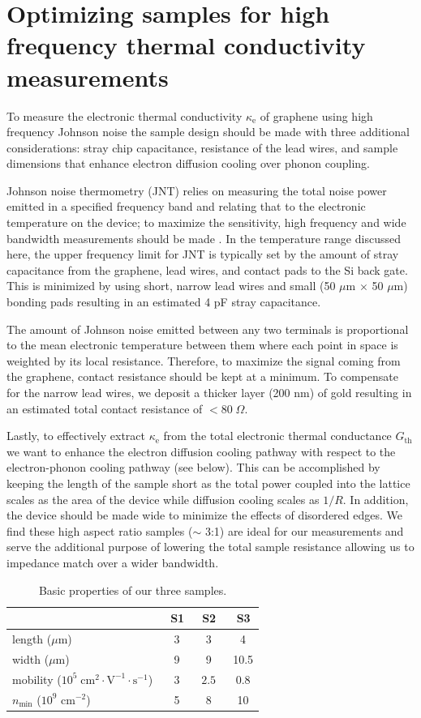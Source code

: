 \section{Optimizing samples for high frequency thermal conductivity measurements}
To measure the electronic thermal conductivity $\kappa_{\mathrm{e}}$ of graphene using high frequency Johnson noise the sample design should be made with three additional considerations: stray chip capacitance, resistance of the lead wires, and sample dimensions that enhance electron diffusion cooling over phonon coupling. 

Johnson noise thermometry (JNT) relies on measuring the total noise power emitted in a specified frequency band and relating that to the electronic temperature on the device; to maximize the sensitivity, high frequency and wide bandwidth measurements should be made \cite{crossno_development_2015}. In the temperature range discussed here, the upper frequency limit for JNT is typically set by the amount of stray capacitance from the graphene, lead wires, and contact pads to the Si back gate. This is minimized by using short, narrow lead wires and small (50 $\mu$m $\times$ 50 $\mu$m) bonding pads resulting in an estimated 4 pF stray capacitance. 

The amount of Johnson noise emitted between any two terminals is proportional to the mean electronic temperature between them where each point in space is weighted by its local resistance. Therefore, to maximize the signal coming from the graphene, contact resistance should be kept at a minimum. To compensate for the narrow lead wires, we deposit a thicker layer (200 nm) of gold resulting in an estimated total contact resistance of $<80\;\Omega$.

Lastly, to effectively extract $\kappa_{\mathrm{e}}$ from the total electronic thermal conductance $G_{\mathrm{th}}$ we want to enhance the electron diffusion cooling pathway with respect to the electron-phonon cooling pathway (see below). This can be accomplished by keeping the length of the sample short as the total power coupled into the lattice scales as the area of the device while diffusion cooling scales as $1/R$. In addition, the device should be made wide to minimize the effects of disordered edges. We find these high aspect ratio samples ($\sim$ 3:1) are ideal for our measurements and serve the additional purpose of lowering the total sample resistance allowing us to impedance match over a wider bandwidth.

\begin{table}[t]
\begin{tabular}{| l | c | c | c |}\hline
&\  S1 &\ S2 &\ S3 \\\hline
length ($\mu$m) &\ 3 &\ 3 &\ 4 \\
width ($\mu$m) &\ 9 &\ 9 &\ 10.5 \\
mobility ($10^5\; \mathrm{cm}^2\cdot \mathrm{V}^{-1}\cdot \mathrm{s}^{-1}$) &\ $3$ &\ $2.5$ &\ $0.8$ \\
$n_{\mathrm{min}}$ ($10^9$ cm$^{-2}$) &\ 5 &\ 8 &\ 10 \\\hline
\end{tabular}
\caption{Basic properties of our three samples.}
\label{table:DF_table1}
\end{table}


